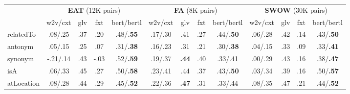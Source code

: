 \documentclass[letterpaper]{article} %
\begin{document}
\begin{table}%
\centering
\begin{tabular}{@{}l|cccc|cccc|cccc@{}}
  & \multicolumn{4}{c}{\textbf{EAT} (12K pairs)} & \multicolumn{4}{c}{\textbf{FA} (8K pairs) }  & \multicolumn{4}{c}{\textbf{SWOW} (30K pairs)}\\

  & w2v/cxt &glv & fxt & bert/bertl & w2v/cxt &glv & fxt & bert/bertl& w2v/cxt &glv & fxt & bert/bertl\\

 \hline

relatedTo &.08/.25&.37&.20& .48/\textbf{.55} &.17/.30 &.41&.27&.44/\textbf{.50}&.06/.28&.42&.14& .43/\textbf{.50}\\

antonym&.05/.15 &.25&.07&.31/\textbf{.38} &.16/.23&.31&.21&.30/\textbf{.38}&.04/.15& .33&.09& .33/\textbf{.41}\\

synonym &-.21/.14&.43&-.03&.52/\textbf{.59} &.19/.37&\textbf{.44}&.40&.33/.41&.00/.29& .43 &.16& .38/\textbf{.47} \\

isA&.06/.33&.45&.27&.50/\textbf{.58} &.23/.41&.44&.37&.43/\textbf{.50}&.03/.34&.39&.16&.50/\textbf{.57} \\

atLocation&.08/.28&.44&.29&.45/\textbf{.52} &.22/.36&\textbf{.47}&.31&.33/.44&.08/.35&.47&.21&.44/\textbf{.52} \\


\end{tabular}
\end{table}
\end{document}
